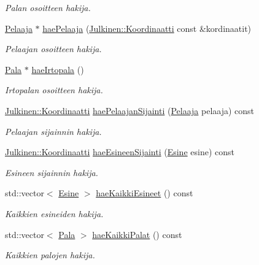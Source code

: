 \begin{DoxyCompactItemize}
\begin{DoxyCompactList}\small\item\em Palan osoitteen hakija. \end{DoxyCompactList}\item 
\hyperlink{class_pelaaja}{Pelaaja} $\ast$ \hyperlink{class_data_ac46ff8a55f904bcbabf22861036b27b6}{hae\+Pelaaja} (\hyperlink{class_julkinen_1_1_koordinaatti}{Julkinen\+::\+Koordinaatti} const \&kordinaatit)
\begin{DoxyCompactList}\small\item\em Pelaajan osoitteen hakija. \end{DoxyCompactList}\item 
\hyperlink{class_pala}{Pala} $\ast$ \hyperlink{class_data_af715df1467da7242a96b2b3f1f288216}{hae\+Irtopala} ()
\begin{DoxyCompactList}\small\item\em Irtopalan osoitteen hakija. \end{DoxyCompactList}\item 
\hyperlink{class_julkinen_1_1_koordinaatti}{Julkinen\+::\+Koordinaatti} \hyperlink{class_data_ad409f9569c098e68308efb7dc92395ac}{hae\+Pelaajan\+Sijainti} (\hyperlink{class_pelaaja}{Pelaaja} pelaaja) const 
\begin{DoxyCompactList}\small\item\em Pelaajan sijainnin hakija. \end{DoxyCompactList}\item 
\hyperlink{class_julkinen_1_1_koordinaatti}{Julkinen\+::\+Koordinaatti} \hyperlink{class_data_a0cc383355bf597282393b629646add61}{hae\+Esineen\+Sijainti} (\hyperlink{class_esine}{Esine} esine) const 
\begin{DoxyCompactList}\small\item\em Esineen sijainnin hakija. \end{DoxyCompactList}\item 
std\+::vector$<$ \hyperlink{class_esine}{Esine} $>$ \hyperlink{class_data_ab233c0e1b05e62bb05ac03c44412ded2}{hae\+Kaikki\+Esineet} () const 
\begin{DoxyCompactList}\small\item\em Kaikkien esineiden hakija. \end{DoxyCompactList}\item 
std\+::vector$<$ \hyperlink{class_pala}{Pala} $>$ \hyperlink{class_data_a3eefbad880fce0532156b1606dceb590}{hae\+Kaikki\+Palat} () const 
\begin{DoxyCompactList}\small\item\em Kaikkien palojen hakija. \end{DoxyCompactList}\item 

\end{DoxyCompactItemize}

